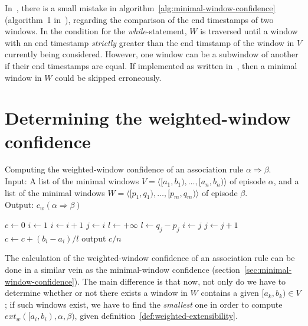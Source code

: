 In~\citep{cule2014marbles}, there is a small mistake in algorithm~\ref{alg:minimal-window-confidence} (algorithm~1 in~\citep{cule2014marbles}), regarding the comparison of the end timestamps of two windows. In the condition for the \emph{while}-statement, $ W $ is traversed until a window with an end timestamp \emph{strictly} greater than the end timstamp of the window in $ V $ currently being considered. However, one window can be a subwindow of another if their end timestamps are equal. If implemented as written in~\cite{cule2014marbles}, then a minimal window in $ W $ could be skipped erroneously.



\section{Determining the weighted-window confidence}
\label{sec:weighted-window-confidence}

\begin{algorithm}

\caption{Computing the weighted-window confidence of an association rule $ \alpha \Rightarrow \beta $.\\
Input: A list of the minimal windows $ V = \langle [a_1, b_1), \ldots, [a_n, b_n) \rangle $ of episode $ \alpha $, and a list of the minimal windows $ W = \langle [p_1, q_1), \ldots, [p_m, q_m) \rangle $ of episode $ \beta $.\\
Output: $ c_w(\alpha \Rightarrow \beta) $
}

\begin{algorithmic}[1]

\State $ c \gets 0 $
\State $ i \gets 1 $
        \State $ i \gets i + 1 $
    \EndWhile
    \State $ j \gets i $
    \State $ l \gets +\infty $
     \label{alglin:weighted-window-confidence:find-smallest-while}
            \State $ l \gets q_j - p_j $
            \State $ i \gets j $
        \EndIf
        \State $ j \gets j + 1 $
    \EndWhile
        \State $ c \gets c + (b_i - a_i) / l $
    \EndIf
\EndFor
\State output $ c / n $

\end{algorithmic}

\label{alg:weighted-window-confidence}
\end{algorithm}

The calculation of the weighted-window confidence of an association rule can be done in a similar vein as the minimal-window confidence (section~\ref{sec:minimal-window-confidence}). The main difference is that now, not only do we have to determine whether or not there exists a window in $ W $ contains a given $ [a_k, b_k) \in V $; if such windows exist, we have to find the \emph{smallest} one in order to compute $ ext_w([a_i, b_i), \alpha, \beta) $, given definition~\ref{def:weighted-extensibility}.

